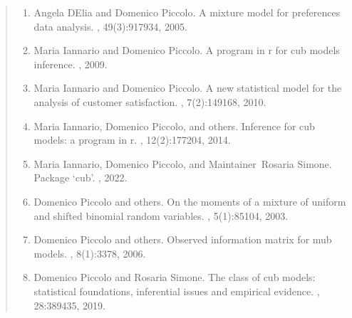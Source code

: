 \documentclass[letterpaper,10pt,english]{sphinxmanual}
\begin{document}
\label{\detokenize{manual:references}}\begin{quote}
\begin{enumerate}
%
\setcounter{enumi}{0}
\item {} 
\sphinxAtStartPar
Angela D\textquotesingle{}Elia and Domenico Piccolo. A mixture model for preferences data analysis. , 49(3):917\textendash{}934, 2005.

\item {} 
\sphinxAtStartPar
Maria Iannario and Domenico Piccolo. A program in r for cub models inference. , 2009.

\item {} 
\sphinxAtStartPar
Maria Iannario and Domenico Piccolo. A new statistical model for the analysis of customer satisfaction. , 7(2):149\textendash{}168, 2010.

\item {} 
\sphinxAtStartPar
Maria Iannario, Domenico Piccolo, and others. Inference for cub models: a program in r. , 12(2):177\textendash{}204, 2014.

\item {} 
\sphinxAtStartPar
Maria Iannario, Domenico Piccolo, and Maintainer Rosaria Simone. Package ‘cub’. , 2022.

\item {} 
\sphinxAtStartPar
Domenico Piccolo and others. On the moments of a mixture of uniform and shifted binomial random variables. , 5(1):85\textendash{}104, 2003.

\item {} 
\sphinxAtStartPar
Domenico Piccolo and others. Observed information matrix for mub models. , 8(1):33\textendash{}78, 2006.

\item {} 
\sphinxAtStartPar
Domenico Piccolo and Rosaria Simone. The class of cub models: statistical foundations, inferential issues and empirical evidence. , 28:389\textendash{}435, 2019.

\end{enumerate}
\end{quote}
\end{document}
